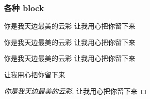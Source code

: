 \documentclass{ctexbeamer}
\begin{document}
\begin{frame}[allowframebreaks]
  \frametitle{各种 block}

  \begin{block}{你是我天边最美的云彩}
    让我用心把你留下来
  \end{block}

  \begin{exampleblock}{你是我天边最美的云彩}
    让我用心把你留下来
  \end{exampleblock}

  \begin{alertblock}{你是我天边最美的云彩}
    让我用心把你留下来
  \end{alertblock}

  \begin{theorem}[你是我天边最美的云彩]
    让我用心把你留下来
  \end{theorem}

  \begin{proof}[你是我天边最美的云彩]
    让我用心把你留下来
  \end{proof}
\end{frame}
\end{document}

